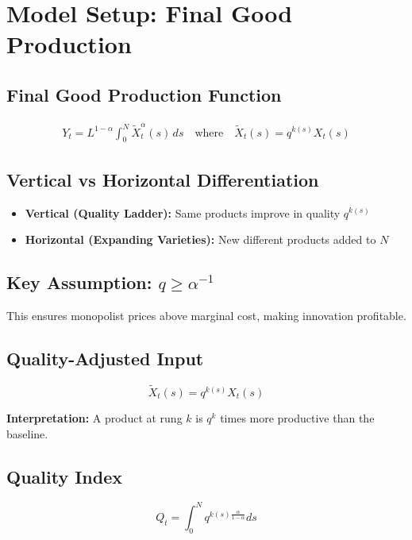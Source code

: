 \documentclass[a4paper,11pt]{article}
\begin{document}
\clearpage

\section{Model Setup: Final Good Production}

\subsection*{Final Good Production Function}
\begin{align*}
Y_t = L^{1-\alpha} \int_0^N \tilde{X}_t^\alpha(s) \, ds
\quad \text{where} \quad \tilde{X}_t(s) = q^{k(s)} X_t(s)
\tag{Final Good}
\end{align*}

\subsection*{Vertical vs Horizontal Differentiation}
\begin{itemize}
    \item \textbf{Vertical (Quality Ladder):} Same products improve in quality $q^{k(s)}$
    \item \textbf{Horizontal (Expanding Varieties):} New different products added to $N$
\end{itemize}

\subsection*{Key Assumption: $q \geq \alpha^{-1}$}
This ensures monopolist prices above marginal cost, making innovation profitable.

\subsection*{Quality-Adjusted Input}
\[
\tilde{X}_t(s) = q^{k(s)} X_t(s)
\]

\medskip
\noindent \textbf{Interpretation:} A product at rung $k$ is $q^k$ times more productive than the baseline.

\subsection*{Quality Index}
\[
Q_t = \int_0^N q^{k(s)\frac{\alpha}{1-\alpha}} ds
\]
\end{document}
